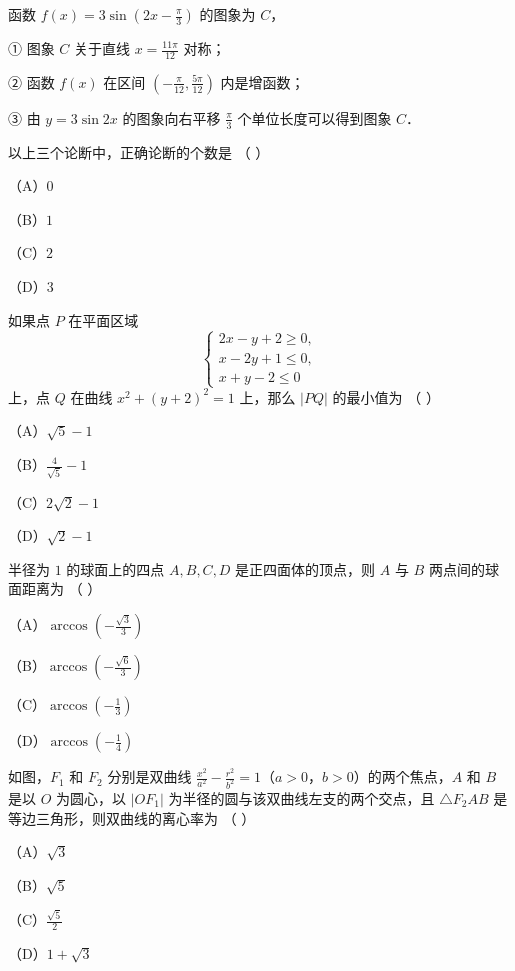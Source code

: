 \begin{question}
函数 $f(x)=3\sin\left(2x-\frac{\pi}{3}\right)$ 的图象为 $C$，

① 图象 $C$ 关于直线 $x=\frac{11\pi}{12}$ 对称；

② 函数 $f(x)$ 在区间 $\left(-\frac{\pi}{12},\frac{5\pi}{12}\right)$ 内是增函数；

③ 由 $y=3\sin2x$ 的图象向右平移 $\frac{\pi}{3}$ 个单位长度可以得到图象 $C$．

以上三个论断中，正确论断的个数是 （ ）

（A）$0$

（B）$1$

（C）$2$

（D）$3$

\end{question}
\begin{question}
如果点 $P$ 在平面区域
\nopagebreak[4]
\[\begin{cases}2x-y+2\geqslant0,\\ x-2y+1\leqslant0,\\ x+y-2\leqslant0\end{cases}\]
上，点 $Q$ 在曲线 $x^2+(y+2)^2=1$ 上，那么 $|PQ|$ 的最小值为 （ ）

（A）$\sqrt5-1$

（B）$\frac{4}{\sqrt5}-1$

（C）$2\sqrt2-1$

（D）$\sqrt2-1$

\end{question}
\begin{question}
半径为 $1$ 的球面上的四点 $A,B,C,D$ 是正四面体的顶点，则 $A$ 与 $B$ 两点间的球面距离为 （ ）

（A）$\arccos\left(-\frac{\sqrt3}{3}\right)$

（B）$\arccos\left(-\frac{\sqrt6}{3}\right)$

（C）$\arccos\left(-\frac13\right)$

（D）$\arccos\left(-\frac14\right)$

\Needspace{0.4\textheight}
\end{question}
\begin{question}
如图，$F_1$ 和 $F_2$ 分别是双曲线 $\frac{x^2}{a^2}-\frac{r^2}{b^2}=1$（$a>0$，$b>0$）的两个焦点，$A$ 和 $B$ 是以 $O$ 为圆心，以 $|OF_1|$ 为半径的圆与该双曲线左支的两个交点，且 $\triangle F_2AB$ 是等边三角形，则双曲线的离心率为 （ ）
\nopagebreak[4]
\begin{center}\end{center}
\nopagebreak[4]
（A）$\sqrt3$

（B）$\sqrt5$

（C）$\frac{\sqrt5}{2}$

（D）$1+\sqrt3$

\end{question}
